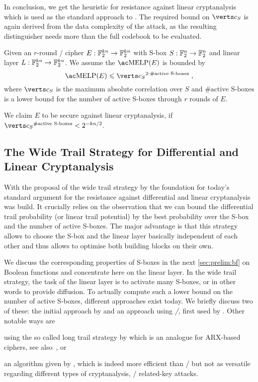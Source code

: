 In conclusion, we get the heuristic for resistance against linear cryptanalysis which is used as the standard approach to .
The required bound on $\abs{c_S}$ is again derived from the data complexity of the attack, as the resulting distinguisher needs more than the full codebook to be evaluated.
\begin{heuristic}\label{heu:lc}
    Given an $r$-round \SPN/ cipher $E : \mathbb{F}_2^{kn} \to \mathbb{F}_2^{kn}$ with S-box $S : \mathbb{F}_2^n \to \mathbb{F}_2^n$ and linear layer $L : \mathbb{F}_2^{kn} \to \mathbb{F}_2^{kn}$.
    We assume the $\mathrm{\MELP/}(E)$ is bounded by
    \begin{equation*}
        \mathrm{\MELP/}(E) \leqslant \abs{c_S}^{2 \cdot \text{\#active S-boxes}}\;,
    \end{equation*}
    where $\abs{c_S}$ is the maximum absolute correlation over $S$ and $\text{\#active S-boxes}$ is a lower bound for the number of active S-boxes through $r$ rounds of $E$.

    We claim $E$ to be secure against linear cryptanalysis, if $\abs{c_S}^{\text{\#active S-boxes}} < 2^{-kn/2}$.
\end{heuristic}

\subsection{The Wide Trail Strategy for Differential and Linear Cryptanalysis}\label{sec:prelim:practical-sec}
With the proposal of the wide trail strategy by \textcite{PhD:Daemen95} the foundation for today's standard argument for the resistance against differential and linear cryptanalysis was build.
It crucially relies on the observation that we can bound the differential trail probability (or linear trail potential) by the best probability over the S-box and the number of active S-boxes.
The major advantage is that this strategy allows to choose the S-box and the linear layer basically independent of each other and thus allows to optimise both building blocks on their own.

We discuss the corresponding properties of S-boxes in the next \cref{sec:prelim:bf} on Boolean functions and concentrate here on the linear layer.
In the wide trail strategy, the task of the linear layer is to activate many S-boxes, or in other words to provide diffusion.
To actually compute such a lower bound on the number of active S-boxes, different approaches exist today.
We briefly discuss two of these: the initial approach by \textcite{PhD:Daemen95} and an approach using \emph{\MILPp/}, first used by \textcite{Inscrypt:MWGP11}.
Other notable ways are \begin{inparaenum}
    \item using the so called long trail strategy by \textcite{AC:DPUVGB16} which is an analogue for ARX-based ciphers, see also~\cite[Chapter~6]{PhD:Perrin17}, or
    \item an algorithm given by \textcite[Section~4]{EC:Matsui94}, which is indeed more efficient than \MILPp/ but not as versatile regarding different types of cryptanalysis, \eg/ related-key attacks.
\end{inparaenum}

